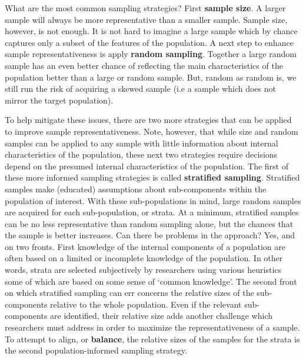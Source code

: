 \documentclass[
  letterpaper,
]{scrbook}
\begin{document}
What are the most common sampling strategies? First
\textbf{sample size}. A larger sample will always be
more representative than a smaller sample. Sample size, however, is not
enough. It is not hard to imagine a large sample which by chance
captures only a subset of the features of the population. A next step to
enhance sample representativeness is apply \textbf{random sampling}.
Together a large random sample has an even better chance of reflecting
the main characteristics of the population better than a large or random
sample. But, random as random is, we still run the risk of acquiring a
skewed sample (i.e a sample which does not mirror the target
population).

To help mitigate these issues, there are two more strategies that can be
applied to improve sample representativeness. Note, however, that while
size and random samples can be applied to any sample with little
information about internal characteristics of the population, these next
two strategies require decisions depend on the presumed internal
characteristics of the population. The first of these more informed
sampling strategies is called \textbf{stratified sampling}. Stratified
samples make (educated) assumptions about sub-components within the
population of interest. With these sub-populations in mind, large random
samples are acquired for each sub-population, or strata. At a minimum,
stratified samples can be no less representative than random sampling
alone, but the chances that the sample is better increases. Can there be
problems in the approach? Yes, and on two fronts. First knowledge of the
internal components of a population are often based on a limited or
incomplete knowledge of the population. In other words, strata are
selected subjectively by researchers using various heuristics some of
which are based on some sense of `common knowledge'. The second front on
which stratified sampling can err concerns the relative sizes of the
sub-components relative to the whole population. Even if the relevant
sub-components are identified, their relative size adds another
challenge which researchers must address in order to maximize the
representativeness of a sample. To attempt to align, or
\textbf{balance}, the relative sizes of the samples for the strata is
the second population-informed sampling strategy.
\end{document}
